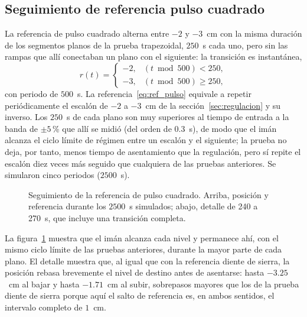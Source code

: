 \FloatBarrier

\subsection{Seguimiento de referencia pulso cuadrado}

La referencia de pulso cuadrado alterna entre $-2$ y $-3$~cm con la misma duración de los segmentos planos de la prueba trapezoidal, $250$~s cada uno, pero sin las rampas que allí conectaban un plano con el siguiente: la transición es instantánea,
\begin{equation}
r(t) =
\begin{cases}
-2, & (t \bmod 500) < 250, \\
-3, & (t \bmod 500) \ge 250,
\end{cases}
\label{eq:ref_pulso}
\end{equation}
con periodo de $500$~s. La referencia~\eqref{eq:ref_pulso} equivale a repetir periódicamente el escalón de $-2$ a $-3$~cm de la sección~\ref{sec:regulacion} y su inverso. Los $250$~s de cada plano son muy superiores al tiempo de entrada a la banda de $\pm5$\,\% que allí se midió (del orden de $0.3$~s), de modo que el imán alcanza el ciclo límite de régimen entre un escalón y el siguiente; la prueba no deja, por tanto, menos tiempo de asentamiento que la regulación, pero sí repite el escalón diez veces más seguido que cualquiera de las pruebas anteriores. Se simularon cinco periodos ($2500$~s).

\begin{figure}[ht]
    \centering
    
    \caption[Seguimiento pulso cuadrado: posición]{Seguimiento de la referencia de pulso cuadrado. Arriba, posición y referencia durante los $2500$~s simulados; abajo, detalle de 240 a 270~s, que incluye una transición completa.}
    \label{fig:pulso_pos}
\end{figure}

La figura~\ref{fig:pulso_pos} muestra que el imán alcanza cada nivel y permanece ahí, con el mismo ciclo límite de las pruebas anteriores, durante la mayor parte de cada plano. El detalle muestra que, al igual que con la referencia diente de sierra, la posición rebasa brevemente el nivel de destino antes de asentarse: hasta $-3.25$~cm al bajar y hasta $-1.71$~cm al subir, sobrepasos mayores que los de la prueba diente de sierra porque aquí el salto de referencia es, en ambos sentidos, el intervalo completo de $1$~cm.

\FloatBarrier

